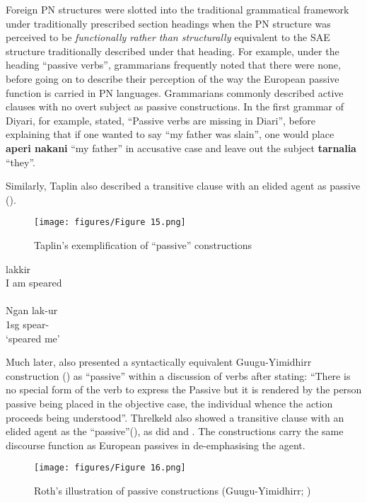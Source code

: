Foreign PN structures were slotted into the traditional grammatical framework under traditionally prescribed section headings when the PN structure was perceived to be \textit{functionally rather than structurally} equivalent to the SAE structure traditionally described under that heading. For example, under the heading “passive verbs'', grammarians frequently noted that there were none, before going on to describe their perception of the way the European passive function is carried in PN languages. Grammarians commonly described active clauses with no overt subject as passive constructions. In the first grammar of Diyari, for example, \citep[no pag.]{koch_untitled_1868} stated, “Passive verbs are missing in Diari”, before explaining that if one wanted to say “my father was slain'', one would place \textbf{aperi nakani} “my father” in accusative case and leave out the subject \textbf{tarnalia} “they”.

Similarly, Taplin also described a transitive clause with an elided agent as passive ().

\begin{figure}
\texttt{[image: figures/Figure 15.png]}
\caption{Taplin’s exemplification of “passive” constructions \citep[17]{taplin_grammar_1878}}
\label{fig:2:15}
\end{figure}

\ea
{} {lakkir}\\
{I am} {speared} \\
\glt \citep[17]{taplin_grammar_1878} \\
\gll Ngan lak-ur\\
1sg spear-\\
\glt `speared me'
\z

Much later, \citet[20]{roth_structure_1901} also presented a syntactically equivalent Guugu-Yimidhirr construction () as “passive” within a discussion of verbs after stating: “There is no special form of the verb to express the Passive but it is rendered by the person passive being placed in the objective case, the individual whence the action proceeds being understood”. Threlkeld also showed a transitive clause with an elided agent as the “passive”(\citeyear[28]{threlkeld_australian_1834}), as did \citet[xx]{symmons_grammatical_1841} and \citet[494]{hale_languages_1846}. The constructions carry the same discourse function as European passives in de-emphasising the agent.

\begin{figure}
\texttt{[image: figures/Figure 16.png]}
\caption{Roth’s illustration of passive constructions (Guugu-Yimidhirr; \citealt[20]{roth_structure_1901})}
\label{fig:2:16}
\end{figure}

